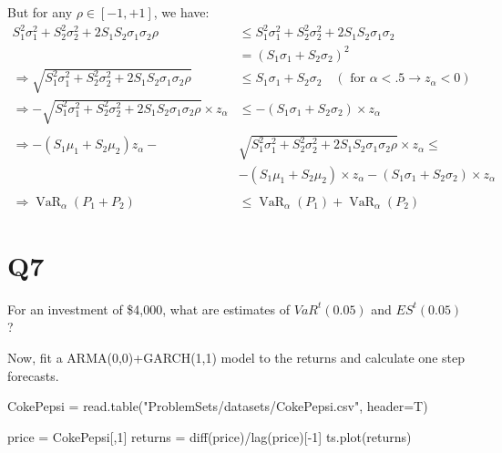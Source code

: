 \documentclass[
  oneside]{book}
\newenvironment{Shaded}{\begin{snugshade}}{\end{snugshade}}
\newcommand{\AttributeTok}[1]{\textcolor[rgb]{0.77,0.63,0.00}{#1}}
\newcommand{\DecValTok}[1]{\textcolor[rgb]{0.00,0.00,0.81}{#1}}
\newcommand{\FunctionTok}[1]{\textcolor[rgb]{0.00,0.00,0.00}{#1}}
\newcommand{\NormalTok}[1]{#1}
\newcommand{\OtherTok}[1]{\textcolor[rgb]{0.56,0.35,0.01}{#1}}
\newcommand{\SpecialCharTok}[1]{\textcolor[rgb]{0.00,0.00,0.00}{#1}}
\newcommand{\StringTok}[1]{\textcolor[rgb]{0.31,0.60,0.02}{#1}}
\begin{document}
But for any \(\rho \in[-1,+1]\), we have:
\[
\begin{aligned}
S_1^2 \sigma_1^2+S_2^2 \sigma_2^2+2 S_1 S_2 \sigma_1 \sigma_2 \rho 
&\leqslant S_1^2 \sigma_1^2+S_2^2 \sigma_2^2+2 S_1 S_2 \sigma_1 \sigma_2\\
&=\left(S_1 \sigma_1+S_2 \sigma_2\right)^2 \\
\Rightarrow \sqrt{S_1^2 \sigma_1^2+S_2^2 \sigma_2^2+2 S_1 S_2 \sigma_1 \sigma_2 \rho} 
&\leqslant S_1 \sigma_1+S_2 \sigma_2 \quad\left(\text { for } \alpha<.5 \rightarrow z_\alpha<0\right) \\
\Rightarrow-\sqrt{S_1^2 \sigma_1^2+S_2^2 \sigma_2^2+2 S_1 S_2 \sigma_1 \sigma_2 \rho} \times z_\alpha 
&\leqslant-\left(S_1 \sigma_1+S_2 \sigma_2\right) \times z_\alpha\\
\\
\Rightarrow-\left(S_1 \mu_1+S_2 \mu_2\right) z_\alpha- &\sqrt{S_1^2 \sigma_1^2+S_2^2 \sigma_2^2+2 S_1 S_2 \sigma_1 \sigma_2 \rho} \times z_\alpha \leqslant\\
&-\left(S_1 \mu_1+S_2 \mu_2\right) \times z_\alpha-\left(S_1 \sigma_1+S_2 \sigma_2\right) \times z_\alpha \\
\\
\Rightarrow \operatorname{VaR}_\alpha\left(P_1+P_2\right)
&\leqslant \operatorname{VaR}_\alpha\left(P_1\right)+\operatorname{VaR}_\alpha\left(P_2\right)
\end{aligned}
\]

\hypertarget{q7}{%
\section{Q7}\label{q7}}

For an investment of \$4,000, what are estimates of \(VaR^t(0.05)\) and \(ES^t(0.05)\)?

Now, fit a ARMA(0,0)+GARCH(1,1) model to the returns and calculate
one step forecasts.

\begin{Shaded}
\begin{Highlighting}[]
\NormalTok{CokePepsi }\OtherTok{=} \FunctionTok{read.table}\NormalTok{(}\StringTok{"ProblemSets/datasets/CokePepsi.csv"}\NormalTok{, }\AttributeTok{header=}\NormalTok{T)}
\end{Highlighting}
\end{Shaded}

\begin{Shaded}
\begin{Highlighting}[]
\NormalTok{price }\OtherTok{=}\NormalTok{ CokePepsi[,}\DecValTok{1}\NormalTok{]}
\NormalTok{returns }\OtherTok{=} \FunctionTok{diff}\NormalTok{(price)}\SpecialCharTok{/}\FunctionTok{lag}\NormalTok{(price)[}\SpecialCharTok{{-}}\DecValTok{1}\NormalTok{]}
\FunctionTok{ts.plot}\NormalTok{(returns)}
\end{Highlighting}
\end{Shaded}
\end{document}
